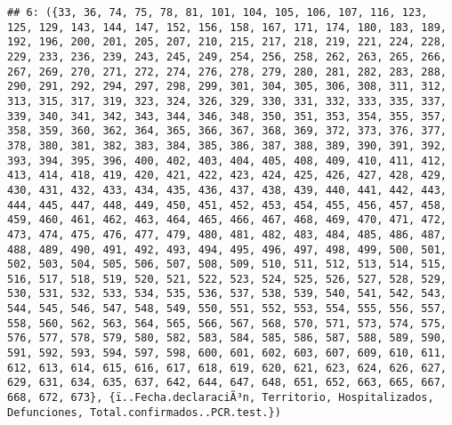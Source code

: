 \documentclass[
]{book}
\begin{document}
\begin{verbatim}
## 6: ({33, 36, 74, 75, 78, 81, 101, 104, 105, 106, 107, 116, 123, 125, 129, 143, 144, 147, 152, 156, 158, 167, 171, 174, 180, 183, 189, 192, 196, 200, 201, 205, 207, 210, 215, 217, 218, 219, 221, 224, 228, 229, 233, 236, 239, 243, 245, 249, 254, 256, 258, 262, 263, 265, 266, 267, 269, 270, 271, 272, 274, 276, 278, 279, 280, 281, 282, 283, 288, 290, 291, 292, 294, 297, 298, 299, 301, 304, 305, 306, 308, 311, 312, 313, 315, 317, 319, 323, 324, 326, 329, 330, 331, 332, 333, 335, 337, 339, 340, 341, 342, 343, 344, 346, 348, 350, 351, 353, 354, 355, 357, 358, 359, 360, 362, 364, 365, 366, 367, 368, 369, 372, 373, 376, 377, 378, 380, 381, 382, 383, 384, 385, 386, 387, 388, 389, 390, 391, 392, 393, 394, 395, 396, 400, 402, 403, 404, 405, 408, 409, 410, 411, 412, 413, 414, 418, 419, 420, 421, 422, 423, 424, 425, 426, 427, 428, 429, 430, 431, 432, 433, 434, 435, 436, 437, 438, 439, 440, 441, 442, 443, 444, 445, 447, 448, 449, 450, 451, 452, 453, 454, 455, 456, 457, 458, 459, 460, 461, 462, 463, 464, 465, 466, 467, 468, 469, 470, 471, 472, 473, 474, 475, 476, 477, 479, 480, 481, 482, 483, 484, 485, 486, 487, 488, 489, 490, 491, 492, 493, 494, 495, 496, 497, 498, 499, 500, 501, 502, 503, 504, 505, 506, 507, 508, 509, 510, 511, 512, 513, 514, 515, 516, 517, 518, 519, 520, 521, 522, 523, 524, 525, 526, 527, 528, 529, 530, 531, 532, 533, 534, 535, 536, 537, 538, 539, 540, 541, 542, 543, 544, 545, 546, 547, 548, 549, 550, 551, 552, 553, 554, 555, 556, 557, 558, 560, 562, 563, 564, 565, 566, 567, 568, 570, 571, 573, 574, 575, 576, 577, 578, 579, 580, 582, 583, 584, 585, 586, 587, 588, 589, 590, 591, 592, 593, 594, 597, 598, 600, 601, 602, 603, 607, 609, 610, 611, 612, 613, 614, 615, 616, 617, 618, 619, 620, 621, 623, 624, 626, 627, 629, 631, 634, 635, 637, 642, 644, 647, 648, 651, 652, 663, 665, 667, 668, 672, 673}, {ï..Fecha.declaraciÃ³n, Territorio, Hospitalizados, Defunciones, Total.confirmados..PCR.test.})

\end{verbatim}
\end{document}
